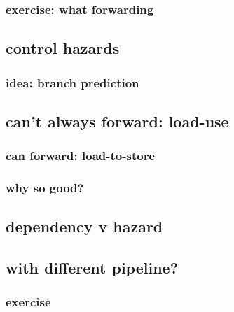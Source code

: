 \subsubsection{exercise: what forwarding}


\subsection{control hazards}

\subsubsection{idea: branch prediction}


\subsection{can't always forward: load-use}


\subsubsection{can forward: load-to-store}




\subsubsection{why so good?}



\subsection{dependency v hazard}




\subsection{with different pipeline?}


\subsubsection{exercise}


